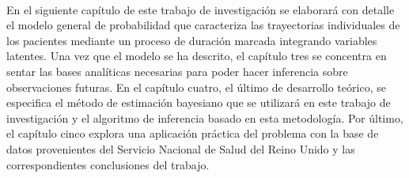 \\
En el siguiente cap\'itulo de este trabajo de investigaci\'on se elaborar\'a con detalle el modelo general de probabilidad que caracteriza las trayectorias individuales de los pacientes mediante un proceso de duraci\'on marcada integrando variables latentes. Una vez que el modelo se ha descrito, el cap\'itulo tres se concentra en sentar las bases anal\'iticas necesarias para poder hacer inferencia sobre observaciones futuras. En el cap\'itulo cuatro, el \'ultimo de desarrollo te\'orico, se especifica el m\'etodo de estimaci\'on bayesiano que se utilizar\'a en este trabajo de investigaci\'on y el algoritmo de inferencia basado en esta metodolog\'ia. Por \'ultimo, el cap\'itulo cinco explora una aplicaci\'on pr\'actica del problema con la base de datos provenientes del Servicio Nacional de Salud del Reino Unido y las correspondientes conclusiones del trabajo. 